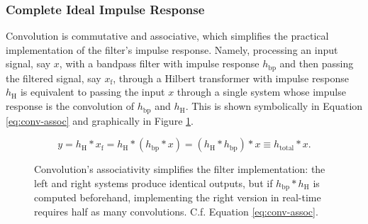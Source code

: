 \subsubsection{Complete Ideal Impulse Response}
Convolution is commutative and associative, which simplifies the practical implementation of the filter's impulse response. Namely, processing an input signal, say $ x $, with a bandpass filter with impulse response $ h_{\mathrm{bp}} $ and then passing the filtered signal, say $ x_{\mathrm{f}} $, through a Hilbert transformer with impulse response $ h_{\mathrm{H}} $ is equivalent to passing the input $ x $ through a single system whose impulse response is the convolution of $ h_{\mathrm{bp}} $ and $ h_{\mathrm{H}} $. This is shown symbolically in Equation \ref{eq:conv-assoc} and graphically in Figure \ref{fig:conv-assoc}.

\begin{equation}
    y = h_{\mathrm{H}} * x_{\mathrm{f}} = h_{\mathrm{H}} * ( h_{\mathrm{bp}} * x ) = (h_{\mathrm{H}} * h_{\mathrm{bp}}) * x \equiv h_{\mathrm{total}} * x. \label{eq:conv-assoc}
\end{equation}
\begin{figure}[htb!]
    \centering
        \caption{Convolution's associativity simplifies the filter implementation: the left and right systems produce identical outputs, but if $ h_{\mathrm{bp}}*h_{\mathrm{H}} $ is computed beforehand, implementing the right version in real-time requires half as many convolutions. C.f. Equation \ref{eq:conv-assoc}.}
        \label{fig:conv-assoc}
\end{figure}

